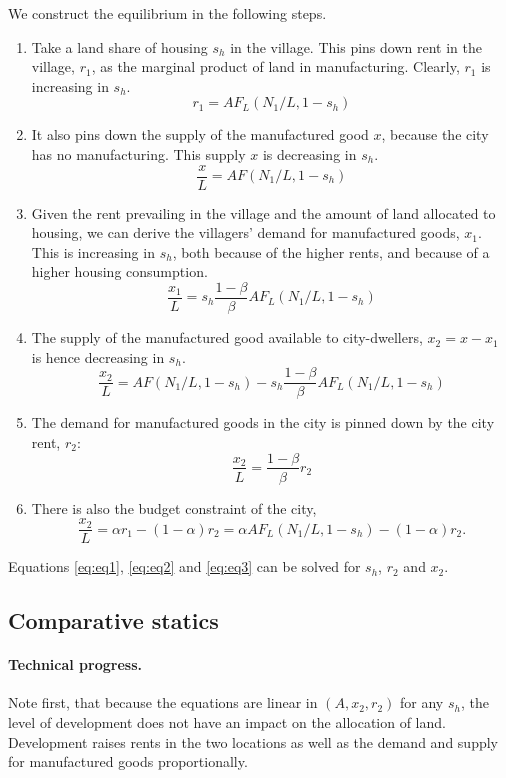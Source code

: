 \documentclass[12pt]{article}
\begin{document}
We construct the equilibrium in the following steps.
\begin{enumerate}
  \item Take a land share of housing $s_h$ in the village. This pins down rent in the village, $r_1$, as the marginal product of land in manufacturing. Clearly, $r_1$ is increasing in $s_h$.
      \[
      r_1 = AF_L(N_1/L,1-s_h)
      \]
  \item It also pins down the supply of the manufactured good $x$, because the city has no manufacturing. This supply $x$ is decreasing in $s_h$.
      \[
      \frac{x}{L} = AF(N_1/L,1-s_h)
      \]
  \item Given the rent prevailing in the village and the amount of land allocated to housing, we can derive the villagers' demand for manufactured goods, $x_1$. This is increasing in $s_h$, both because of the higher rents, and because of a higher housing consumption.
      \[
      \frac{x_1}{L} = s_h\frac{1-\beta}{\beta}AF_L(N_1/L,1-s_h)
      \]
  \item The supply of the manufactured good available to city-dwellers, $x_2=x-x_1$ is hence decreasing in $s_h$.
      \begin{equation}\label{eq:eq1}
      \frac{x_2}{L} = AF(N_1/L,1-s_h)-s_h\frac{1-\beta}{\beta}AF_L(N_1/L,1-s_h)
      \end{equation}
  \item The demand for manufactured goods in the city is pinned down by the city rent, $r_2$:
      \begin{equation}\label{eq:eq2}
      \frac{x_2}{L} = \frac{1-\beta}{\beta}r_2
      \end{equation}
  \item There is also the budget constraint of the city,
  \begin{equation}\label{eq:eq3}
    \frac{x_2}{L} = \alpha r_1 -(1-\alpha)r_2 = \alpha AF_L(N_1/L,1-s_h) -(1-\alpha)r_2.
  \end{equation}
\end{enumerate}
Equations \eqref{eq:eq1}, \eqref{eq:eq2} and \eqref{eq:eq3} can be solved for $s_h$, $r_2$ and $x_2$. 

\subsection{Comparative statics}
\paragraph{Technical progress.}
Note first, that because the equations are linear in $(A,x_2,r_2)$ for any $s_h$, the level of development does not have an impact on the allocation of land. Development raises rents in the two locations as well as the demand and supply for manufactured goods proportionally.
\end{document}
